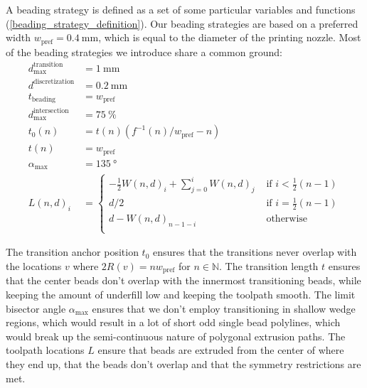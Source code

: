 A beading strategy is defined as a set of some particular variables and functions (\cref{beading_strategy_definition}).
Our beading strategies are based on a preferred width $w_\text{pref} = \SI{0.4}{\milli\meter}$, which is equal to the diameter of the printing nozzle.
Most of the beading strategies we introduce share a common ground:
\begin{align*}
d_\text{max}^\text{transition} &= \SI{1}{\milli\meter} \\
d^\text{discretization} &= \SI{0.2}{\milli\meter} \\
t_\text{beading} &= w_\text{pref} \\
d_\text{max}^\text{intersection} &= \SI{75}{\percent} \\
%
t_0(n) &=  t(n) \left( f^{-1}(n) / w_\text{pref}  - n \right) \\
t(n) &= w_\text{pref} \\
\alpha_\text{max} &= \SI{135}{\degree} \\
L(n,d)_i &= 
\begin{cases}
-\frac12 W(n,d)_i + \sum_{j=0}^i W(n,d)_j & \text{ if } i < \frac12 (n -1) \\
d/2 & \text{ if } i =  \frac12 (n -1) \\
d - W(n,d)_{n-1-i} & \text{ otherwise }\\
\end{cases}
\end{align*}

The transition anchor position $t_0$ ensures that the transitions never overlap with the locations $v$ where $2 R(v) = n w_\text{pref}$ for $n \in \mathbb{N}$.
The transition length $t$ ensures that the center beads don't overlap with the innermost transitioning beads, while keeping the amount of underfill low and keeping the toolpath smooth.
The limit bisector angle $\alpha_\text{max}$ ensures that we don't employ transitioning in shallow wedge regions, which would result in a lot of short odd single bead polylines, which would break up the semi-continuous nature of polygonal extrusion paths.
The toolpath locations $L$ ensure that beads are extruded from the center of where they end up, that the beads don't overlap and that the symmetry restrictions are met.


